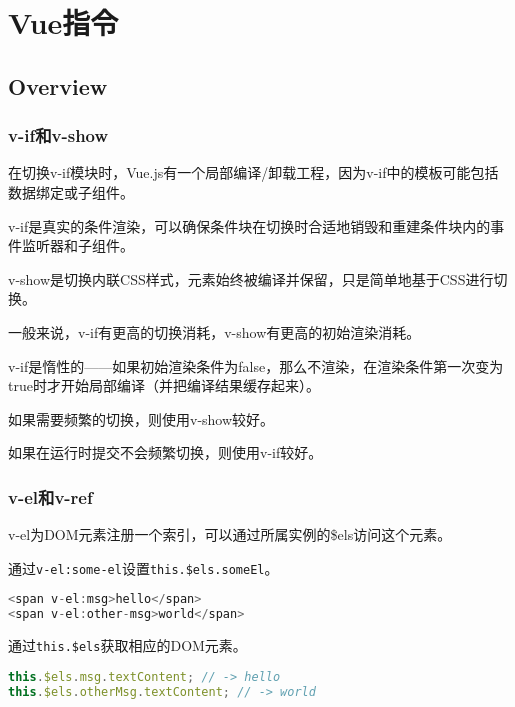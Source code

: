 \part{Vue指令}


\chapter{Overview}



\section{v-if和v-show}

在切换v-if模块时，Vue.js有一个局部编译/卸载工程，因为v-if中的模板可能包括数据绑定或子组件。

\begin{compactitem}
\item v-if是真实的条件渲染，可以确保条件块在切换时合适地销毁和重建条件块内的事件监听器和子组件。
\item v-show是切换内联CSS样式，元素始终被编译并保留，只是简单地基于CSS进行切换。
\end{compactitem}

一般来说，v-if有更高的切换消耗，v-show有更高的初始渲染消耗。

v-if是惰性的——如果初始渲染条件为false，那么不渲染，在渲染条件第一次变为true时才开始局部编译（并把编译结果缓存起来）。

\begin{compactitem}
\item 如果需要频繁的切换，则使用v-show较好。
\item 如果在运行时提交不会频繁切换，则使用v-if较好。
\end{compactitem}

\section{v-el和v-ref}

v-el为DOM元素注册一个索引，可以通过所属实例的\$els访问这个元素。

\begin{compactitem}
\item 通过\texttt{v-el:some-el}设置\texttt{this.\$els.someEl}。


\begin{lstlisting}[language=JavaScript]
<span v-el:msg>hello</span>
<span v-el:other-msg>world</span>
\end{lstlisting}

\item 通过\texttt{this.\$els}获取相应的DOM元素。

\begin{lstlisting}[language=JavaScript]
this.$els.msg.textContent; // -> hello
this.$els.otherMsg.textContent; // -> world
\end{lstlisting}

\end{compactitem}

